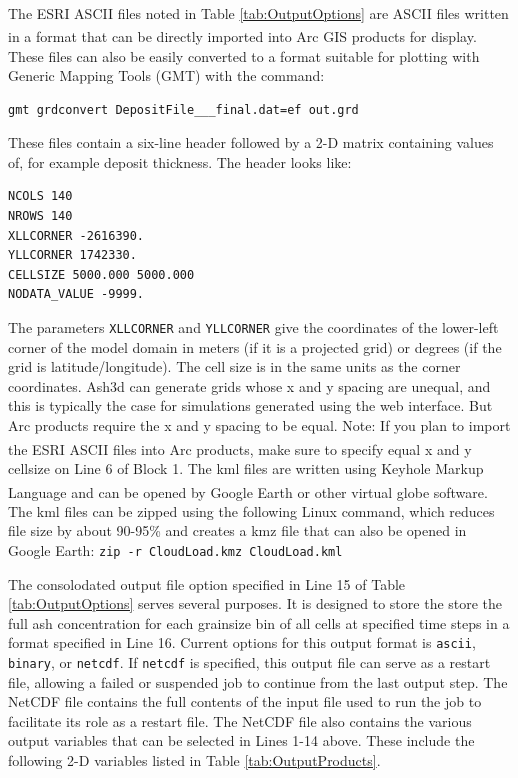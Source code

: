 \normalsize
The ESRI\textsuperscript{\tiny\textregistered} ASCII files noted in Table \ref{tab:OutputOptions}
are ASCII files written in a format that
can be directly imported into Arc\textsuperscript{\tiny\textregistered}
GIS products for display.
These files can also be easily converted to a format suitable for plotting with
Generic Mapping Tools (GMT) with the command:
\begin{verbatim}
gmt grdconvert DepositFile___final.dat=ef out.grd
\end{verbatim}
These files contain a six-line
header followed by a 2-D matrix containing values of, for example deposit thickness.
The header looks like:
\small
\begin{verbatim}
NCOLS 140
NROWS 140
XLLCORNER -2616390.
YLLCORNER 1742330.
CELLSIZE 5000.000 5000.000
NODATA_VALUE -9999.
\end{verbatim}
\normalsize

The parameters \texttt{XLLCORNER} and \texttt{YLLCORNER} give the coordinates
of the lower-left
corner of the model domain in meters (if it is a projected grid) or degrees (if
the grid is latitude/longitude). The cell size is in the same units as the corner
coordinates. 
Ash3d can generate grids whose x and y spacing are unequal, and this is
typically the case for simulations generated using the web interface. But Arc
products require the x and y spacing to be equal. Note: If you plan to import
the ESRI\textsuperscript{\tiny\textregistered} ASCII files into
Arc products, make sure to specify equal x and y cellsize
on Line 6 of Block 1.
The kml files are written using Keyhole Markup Language and can be opened by
Google Earth\textsuperscript{\tiny\textregistered} or other virtual globe
software. The kml files can be zipped using the
following Linux command, which reduces file size by about 90-95\% and creates a
kmz file that can also be opened in Google Earth:
\texttt{zip -r CloudLoad.kmz CloudLoad.kml}

The consolodated output file option specified in Line 15 of Table \ref{tab:OutputOptions}
serves several purposes.  It is designed to store the store the full ash concentration
for each grainsize bin
of all cells at specified time steps in a format specified in Line 16.  Current options
for this output format is \texttt{ascii}, \texttt{binary}, or \texttt{netcdf}.
If \texttt{netcdf}
is specified, this output file can serve as a restart file, allowing a failed or
suspended job to continue from the last output step.  The NetCDF file contains
the full contents of the input file used to run the job to facilitate its
role as a restart file.
The NetCDF file also contains the various output variables that can be selected
in Lines 1-14 above.  These include the following 2-D variables listed in
Table \ref{tab:OutputProducts}.

